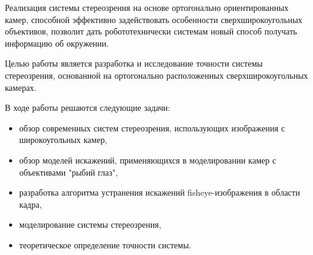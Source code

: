   Реализация системы стереозрения на основе ортогонально ориентированных камер, способной эффективно задействовать особенности 
  сверхширокоугольных объективов, позволит дать робототехнически системам новый способ получать информацию об окружении.

Целью работы является разработка и исследование точности системы стереозрения, основанной на ортогонально расположенных сверхширокоугольных камерах.

В ходе работы решаются следующие задачи:
\begin{itemize}     %
    \item обзор современных систем стереозрения, использующих изображения с широкоугольных камер,
    \item обзор моделей искажений, применяющихся в моделировании камер с объективами "рыбий глаз",
    \item разработка алгоритма устранения искажений fisheye-изображения в  области кадра, %
    \item моделирование системы  стереозрения,                                      
    \item теоретическое определение точности системы.  
\end{itemize}


\clearpage